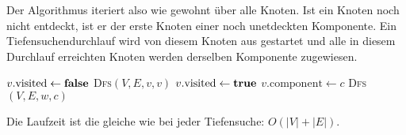 \documentclass[11pt,a4paper]{article}
\begin{document}
\begin{loesung}
\begin{enumerate}
        Der Algorithmus iteriert also wie gewohnt über alle Knoten.
        Ist ein Knoten noch nicht entdeckt, ist er der erste Knoten einer noch unetdeckten Komponente.
        Ein Tiefensuchendurchlauf wird von diesem Knoten aus gestartet und alle in diesem Durchlauf erreichten Knoten werden derselben Komponente zugewiesen.
        \begin{algorithmic}[1]
                    \State $v.\mathrm{visited} \gets \text{\textbf{false}}$
                \EndFor
                        \State \textsc{Dfs}$(V, E, v, v)$
                    \EndIf
                \EndFor
            \EndProcedure
                \State $v.\mathrm{visited} \gets \text{\textbf{true}}$
                \State $v.\mathrm{component} \gets c$
                        \State \textsc{Dfs}$(V, E, w, c)$
                    \EndIf
                \EndFor
            \EndProcedure
        \end{algorithmic}
        Die Laufzeit ist die gleiche wie bei jeder Tiefensuche: $O(|V| + |E|)$.
    \end{enumerate}
\end{loesung}
\end{document}
